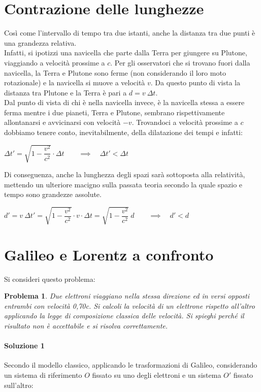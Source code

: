 \documentclass[a4paper,12pt]{report}
\begin{document}
\section{Contrazione delle lunghezze}
Così come l'intervallo di tempo tra due istanti, anche la distanza tra due punti è una grandezza relativa.\\
Infatti, si ipotizzi una navicella che parte dalla Terra per giungere su Plutone, viaggiando a velocità prossime a $c$. Per gli osservatori che si trovano fuori dalla navicella, la Terra e Plutone sono ferme (non considerando il loro moto rotazionale) e la navicella si muove  a velocità $v$. Da questo punto di vista la distanza tra Plutone e la Terra è pari a $d = v\:\Delta t$.\\ 
Dal punto di vista di chi è nella navicella invece,  è la navicella stessa a essere ferma mentre i due pianeti, Terra e Plutone, sembrano rispettivamente allontanarsi e avvicinarsi con velocità $-v$. Trovandoci a velocità prossime a $c$ dobbiamo tenere conto, inevitabilmente, della dilatazione dei tempi e infatti: 
\begin{center}
$\Delta t' = \sqrt{1 - \dfrac{v^2}{c^2}} \cdot \Delta t \qquad \implies \quad \Delta t' < \Delta t$
\end{center}
Di conseguenza, anche la lunghezza degli spazi sarà sottoposta alla relatività, mettendo un ulteriore macigno sulla passata teoria secondo la quale spazio e tempo sono grandezze assolute.
\begin{center}
$d' = v\: \Delta t' = \sqrt{1- \dfrac{v^2}{c^2}} \cdot v \cdot \Delta t = \sqrt{1- \dfrac{v^2}{c^2}}\:d \qquad \implies \quad d'<d$
\end{center}

\section{Galileo e Lorentz a confronto}
Si consideri questo problema:
\newtheorem{problem}{Problema}
\begin{problem}
Due elettroni viaggiano nella stessa direzione ed in versi opposti entrambi con velocità
0,70c. Si calcoli la velocità di un elettrone rispetto all’altro applicando la legge di
composizione classica delle velocità. Si spieghi perché il risultato non è accettabile e si
risolva correttamente.
\end{problem}

\paragraph{Soluzione 1} Secondo il modello classico, applicando le trasformazioni di Galileo, considerando un sistema di riferimento $O$ fissato su uno degli elettroni e un sistema $O'$ fissato sull'altro: \\
\end{document}
